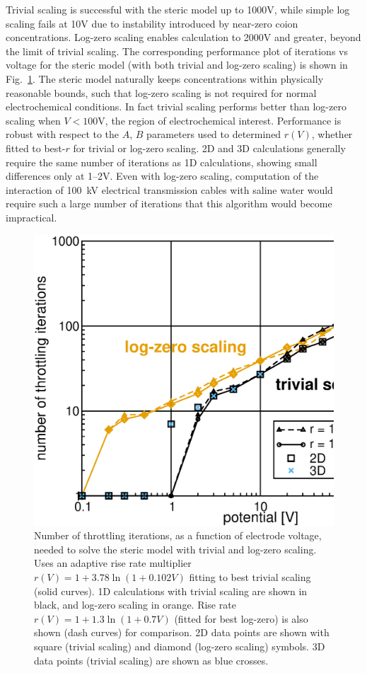 Trivial scaling is successful with the steric model up to 1000V, while simple log
scaling fails at 10V due to instability introduced by near-zero coion
concentrations.
Log-zero scaling enables calculation to 2000V
and greater, beyond the limit of trivial scaling.
The corresponding
performance plot of iterations vs voltage for the steric model
(with both trivial and log-zero scaling) is shown in Fig.~\ref{fig:convergence}.
 The steric model
naturally keeps concentrations within 
physically reasonable bounds, such that  log-zero scaling is not
required for normal electrochemical conditions. In fact
trivial scaling performs better than log-zero scaling when $V<100$V,
the region of electrochemical interest.
Performance is robust with respect to the $A$, $B$ parameters used to
determined $r(V)$, whether fitted to best-$r$ for trivial or log-zero scaling.
2D and 3D calculations generally require the same number of iterations
as 1D calculations, showing small differences only at 1--2V.
Even with log-zero scaling, computation of the interaction of
100~kV electrical transmission cables with saline water would require
such a large number of iterations that this algorithm would become impractical.

\begin{figure}
\centering
\includegraphics[width=0.8\linewidth]{num_attempts_vs_V.eps}
\caption{Number of throttling iterations,  as a function of electrode
  voltage, needed to solve the steric model with trivial and log-zero scaling.
  Uses an adaptive rise rate multiplier
  $r(V)=1+3.78\ln(1+0.102V)$ fitting to best trivial scaling (solid
  curves). 1D calculations with trivial scaling are shown in black,
  and log-zero scaling in orange. Rise rate $r(V)=1+1.3 \ln(1+0.7V)$
  (fitted for best log-zero) is also shown (dash curves) for
  comparison. 2D data points are shown with square (trivial scaling) and
  diamond (log-zero scaling) symbols. 3D data points (trivial scaling) are
  shown as blue crosses.
}
\label{fig:convergence}
\end{figure}


